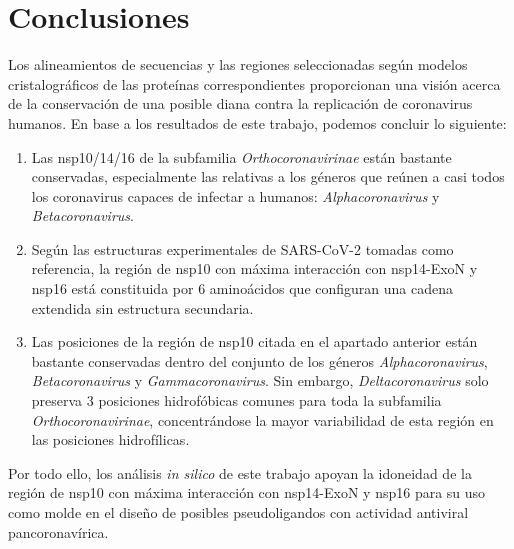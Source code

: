\section{Conclusiones}

Los alineamientos de secuencias y las regiones seleccionadas según modelos
cristalográficos de las proteínas correspondientes proporcionan una visión 
acerca de la conservación de una posible diana contra la replicación de 
coronavirus humanos. En base a los resultados de este trabajo, podemos concluir 
lo siguiente:

\begin{enumerate}

\item Las nsp10/14/16 de la subfamilia \textit{Orthocoronavirinae} están bastante 
conservadas, especialmente las relativas a los géneros que reúnen a casi 
todos los coronavirus capaces de infectar a humanos: 
\textit{Alphacoronavirus} y \textit{Betacoronavirus}.

\item Según las estructuras experimentales de SARS-CoV-2 tomadas como 
referencia, la región de nsp10 con máxima interacción con nsp14-ExoN y nsp16
está constituida por 6 aminoácidos que configuran una cadena extendida sin 
estructura secundaria.

\item Las posiciones de la región de nsp10 citada en el apartado anterior 
están bastante conservadas dentro del conjunto de los géneros 
\textit{Alphacoronavirus}, \textit{Betacoronavirus} y 
\textit{Gammacoronavirus}. Sin embargo, \textit{Deltacoronavirus} solo 
preserva 3 posiciones hidrofóbicas comunes para toda la subfamilia 
\textit{Orthocoronavirinae}, concentrándose la mayor variabilidad de esta 
región en las posiciones hidrofílicas.

\end{enumerate}

Por todo ello, los análisis \textit{in silico} de este trabajo apoyan la 
idoneidad de la región de nsp10 con máxima interacción con nsp14-ExoN y 
nsp16 para su uso como molde en el diseño de posibles pseudoligandos con 
actividad antiviral pancoronavírica.